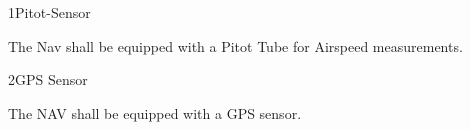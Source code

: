\req
	{1}{Pitot-Sensor}
	{

        The Nav shall be equipped with a Pitot Tube for Airspeed measurements.

    }
	{}

\req
	{2}{GPS Sensor}
	{

        The NAV shall be equipped with a GPS sensor.

    }
	{}

